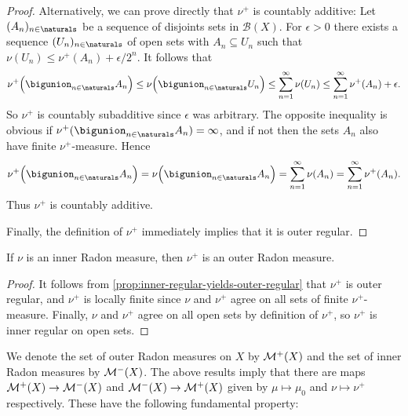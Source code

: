 \documentclass[article, a4paper, 11pt, oneside]{memoir}
\numberwithin{equation}{chapter}
\newcommand{\calB}{\mathcal{B}}
\newcommand{\borel}[1]{\calB(#1)}
\begin{document}
\begin{proof}
    Alternatively, we can prove directly that $\nu^+$ is countably additive: Let $(A_n)_{n \in \naturals}$ be a sequence of disjoints sets in $\borel{X}$. For $\epsilon > 0$ there exists a sequence $(U_n)_{n \in \naturals}$ of open sets with $A_n \subseteq U_n$ such that $\nu(U_n) \leq \nu^+(A_n) + \epsilon/2^n$. It follows that
    \begin{equation*}
        \nu^+ \Bigl( \bigunion_{n \in \naturals} A_n \Bigr)
            \leq \nu \Bigl( \bigunion_{n \in \naturals} U_n \Bigr)
            \leq \sum_{n=1}^\infty \nu(U_n)
            \leq \sum_{n=1}^\infty \nu^+(A_n) + \epsilon.
    \end{equation*}
    So $\nu^+$ is countably subadditive since $\epsilon$ was arbitrary. The opposite inequality is obvious if $\nu^+( \bigunion_{n \in \naturals} A_n ) = \infty$, and if not then the sets $A_n$ also have finite $\nu^+$-measure. Hence
    \begin{equation*}
        \nu^+ \Bigl( \bigunion_{n \in \naturals} A_n \Bigr)
            = \nu \Bigl( \bigunion_{n \in \naturals} A_n \Bigr)
            = \sum_{n=1}^\infty \nu(A_n)
            = \sum_{n=1}^\infty \nu^+(A_n).
    \end{equation*}
    Thus $\nu^+$ is countably additive.

    Finally, the definition of $\nu^+$ immediately implies that it is outer regular.
\end{proof}


\begin{corollary}
    If $\nu$ is an inner Radon measure, then $\nu^+$ is an outer Radon measure.
\end{corollary}

\begin{proof}
    It follows from \cref{prop:inner-regular-yields-outer-regular} that $\nu^+$ is outer regular, and $\nu^+$ is locally finite since $\nu$ and $\nu^+$ agree on all sets of finite $\nu^+$-measure. Finally, $\nu$ and $\nu^+$ agree on all open sets by definition of $\nu^+$, so $\nu^+$ is inner regular on open sets.
\end{proof}


We denote the set of outer Radon measures on $X$ by $\mathcal{M}^{+}(X)$ and the set of inner Radon measures by $\mathcal{M}^{-}(X)$. The above results imply that there are maps $\mathcal{M}^{+}(X) \to \mathcal{M}^{-}(X)$ and $\mathcal{M}^{-}(X) \to \mathcal{M}^{+}(X)$ given by $\mu \mapsto \mu_0$ and $\nu \mapsto \nu^+$ respectively. These have the following fundamental property:
\end{document}
